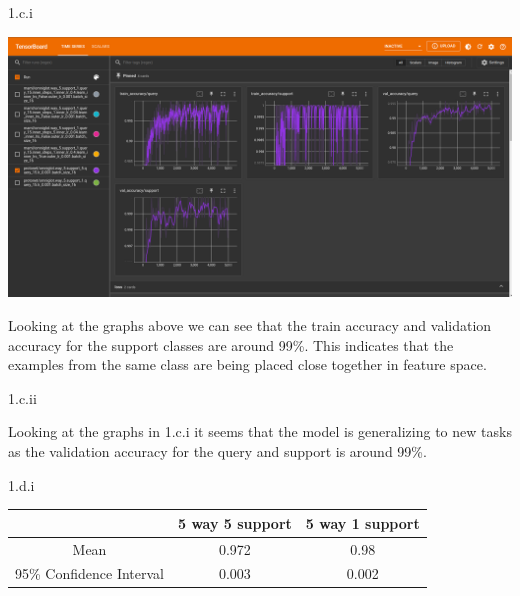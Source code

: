 \clearpage

\LARGE
1.c.i
\normalsize

\begin{answer}
	\begin{center}
		\includegraphics[width=1.0\textwidth]{proto_5_5}
	\end{center}
	Looking at the graphs above we can see that the train accuracy and validation accuracy for the support classes are around 99\%. 
	This indicates that the examples from the same class are being placed close together in feature space.
\end{answer}

\LARGE
1.c.ii
\normalsize

\begin{answer}
	Looking at the graphs in 1.c.i it seems that the model is generalizing to new tasks as the validation accuracy for the query and support is around 99\%. 
\end{answer}

\clearpage

\LARGE
1.d.i
\normalsize

\begin{answer}
	\begin{center}
		\begin{tabular}{c c c}
		        \hline
			 & 5 way 5 support & 5 way 1 support \\
			\hline
			Mean & 0.972 & 0.98 \\
			\hline
			95\% Confidence Interval & 0.003 & 0.002 \\
			\hline
		\end{tabular}
	\end{center}
\end{answer}

